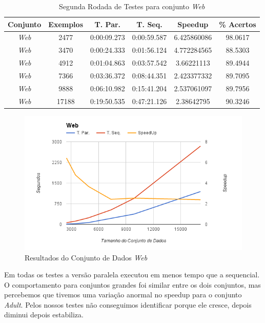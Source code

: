 
\begin{table}
    \caption{Segunda Rodada de Testes para conjunto \emph{Web}}
    \label{tab:bestResults2w}
    \small
    \centering
    \begin{tabular}{|c|c|c|c|c|c|} \hline
		Conjunto & Exemplos & T. Par. & T. Seq. & Speedup & \% Acertos\\ \hline
		\em{Web} & 2477 & 0:00:09.273 & 0:00:59.587 & 6.425860086 & 98.0617\\ \hline
		\em{Web} & 3470 & 0:00:24.333 & 0:01:56.124 & 4.772284565 & 88.5303\\ \hline
		\em{Web} & 4912 & 0:01:04.863 & 0:03:57.542 & 3.66221113 & 89.4944\\ \hline
		\em{Web} & 7366 & 0:03:36.372 & 0:08:44.351 & 2.423377332 & 89.7095\\ \hline
		\em{Web} & 9888 & 0:06:10.982 & 0:15:41.204 & 2.537061097 & 89.7956\\ \hline
		\em{Web} & 17188 & 0:19:50.535 & 0:47:21.126 & 2.38642795 & 90.3246\\ \hline
    \end{tabular}
\end{table}

\begin{figure}
  \centering
  \includegraphics[width=1\textwidth]{imagens/GraficoWeb.png}
  \caption{Resultados do Conjunto de Dados \emph{Web}}
  \label{fig:GraficoWeb}
\end{figure}

Em todas os testes a versão paralela executou em menos tempo que a sequencial. O comportamento para conjuntos grandes foi similar entre os dois conjuntos, mas percebemos que tivemos uma variação anormal no speedup para o conjunto \emph{Adult}. Pelos nossos testes não conseguimos identificar porque ele cresce, depois diminui depois estabiliza.

